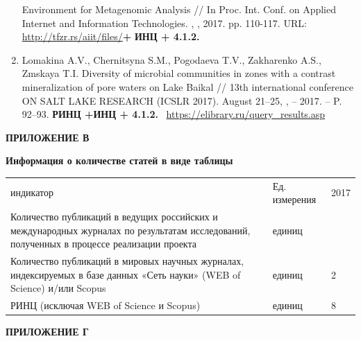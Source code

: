 \documentclass[a4paper,12pt,openany,final]{extreport}
\begin{document}
\begin{enumerate}
  Environment for Metagenomic Analysis // In Proc. Int. Conf. on Applied
  Internet and Information Technologies. , , 2017. pp. 110-117. URL:
  \href{http://tfzr.rs/aiit/files/ProceedingsAIIT2017.pdf}{{http://tfzr.rs/aiit/files/}}\textbf{+}
  \textbf{ИНЦ + 4.1.2.}
\item
  Lomakina A.V., Chernitsyna S.M., Pogodaeva T.V., Zakharenko A.S.,
  Zmskaya T.I. Diversity of microbial communities in zones with a
  contrast mineralization of pore waters on Lake Baikal // 13th
  international conference ON SALT LAKE RESEARCH (ICSLR 2017). August
  21--25, , -- 2017. -- P. 92--93. \textbf{РИНЦ +ИНЦ + 4.1.2.}
  ~\href{https://elibrary.ru/query_results.asp}{{https://elibrary.ru/query\_results.asp}}
\end{enumerate}

\textbf{ПРИЛОЖЕНИЕ В}

\textbf{Информация о количестве статей в виде таблицы}

\begin{longtable}[]{@{}lll@{}}
\toprule
индикатор & Ед. измерения & 2017\tabularnewline
Количество публикаций в ведущих российских и международных журналах по
результатам исследований, полученных в процессе реализации проекта &
единиц &\tabularnewline
Количество публикаций в мировых научных журналах, индексируемых в базе
данных «Сеть науки» (WEB of Science) и/или Scopus & единиц &
2\tabularnewline
РИНЦ (исключая WEB of Science и Scopus) & единиц & 8\tabularnewline
\bottomrule
\end{longtable}

\textbf{ПРИЛОЖЕНИЕ Г}
\end{document}
